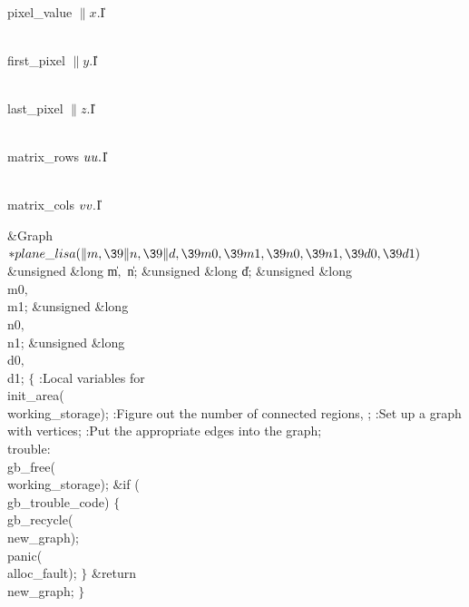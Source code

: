 \Y\B\4\D\\{pixel\_value}\5
$\|x.{}$\|I\par
\B\4\D\\{first\_pixel}\5
$\|y.{}$\|I\par
\B\4\D\\{last\_pixel}\5
$\|z.{}$\|I\par
\B\4\D\\{matrix\_rows}\5
$\\{uu}.{}$\|I\par
\B\4\D\\{matrix\_cols}\5
$\\{vv}.{}$\|I\par
\Y\B\1\1\&{Graph} ${}{*}\\{plane\_lisa}(\|m,\39\|n,\39\|d,\39\\{m0},\39\\{m1},%
\39\\{n0},\39\\{n1},\39\\{d0},\39\\{d1}){}$\6
\&{unsigned} \&{long} \|m${},{}$ \|n;\6
\&{unsigned} \&{long} \|d;\6
\&{unsigned} \&{long} \\{m0}${},{}$ \\{m1};\C{ input will be from rows $[\PB{%
\\{m0}}\,.\,.\,\PB{\\{m1}})$ }\6
\&{unsigned} \&{long} \\{n0}${},{}$ \\{n1};\C{ and from columns $[\PB{\\{n0}}%
\,.\,.\,\PB{\\{n1}})$ }\6
\&{unsigned} \&{long} \\{d0}${},{}$ \\{d1};\2\2\6
${}\{{}$\5
\1:Local variables for \X\7
\\{init\_area}(\\{working\_storage});\6
:Figure out the number of connected regions, \X;\6
:Set up a graph with  vertices\X;\6
:Put the appropriate edges into the graph\X;\6
\4\\{trouble}:\5
\\{gb\_free}(\\{working\_storage});\6
\&{if} (\\{gb\_trouble\_code})\5
${}\{{}$\1\6
\\{gb\_recycle}(\\{new\_graph});\6
\\{panic}(\\{alloc\_fault});\6
\4${}\}{}$\2\6
\&{return} \\{new\_graph};\6
\4${}\}{}$\2\par
\fi

